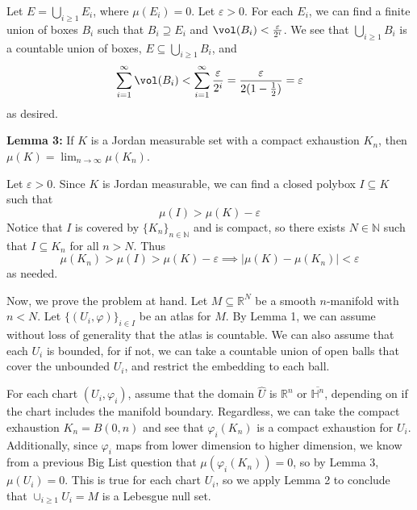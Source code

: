 \documentclass{../../../tex-setup/eh-homework}
\begin{document}
\begin{question}{42}
        Let \(E = \bigcup_{i \geq 1} E_i\), where \(\mu (E_i) = 0\). Let \(\varepsilon > 0\). For each \(E_i\), we can find a finite union of boxes \(B_i\) such that \(B_i \supseteq E_i\) and \(\vol (B_i) < \frac{\varepsilon}{2^i}\). We see that \(\bigcup_{i\geq1}B_i\) is a countable union of boxes, \(E \subseteq \bigcup_{i\geq1}B_i\), and
        \[
            \sum_{i = 1}^{\infty} \vol (B_i) < \sum_{i=1}^{\infty} \frac{\varepsilon}{2^i} = \frac{\varepsilon}{2(1 - \frac{1}{2})} = \varepsilon
        \]
        as desired.

        \medskip

        \textbf{Lemma 3:} If \(K\) is a Jordan measurable set with a compact exhaustion \(K_n\), then \(\mu (K) = \lim_{n \to \infty} \mu (K_n)\).

        Let \(\varepsilon > 0\). Since \(K\) is Jordan measurable, we can find a closed polybox \(I \subseteq K\) such that
        \[
            \mu (I) > \mu (K) - \varepsilon
        \]
        Notice that \(I\) is covered by \(\{ K_n \} _{n \in \mathbb{N}}\) and is compact, so there exists \(N \in \mathbb{N}\) such that \(I \subseteq K_n\) for all \(n > N\). Thus
        \[
            \mu (K_n) > \mu (I) > \mu (K) - \varepsilon \implies |\mu (K) - \mu (K_n)| < \varepsilon
        \]
        as needed.

        \medskip

        Now, we prove the problem at hand. Let \(M \subseteq \mathbb{R}^N\) be a smooth \(n\)-manifold with \(n < N\). Let \(\{ (U_i, \varphi)\}_{i \in I}\) be an atlas for \(M\). By Lemma 1, we can assume without loss of generality that the atlas is countable. We can also assume that each \(U_i\) is bounded, for if not, we can take a countable union of open balls that cover the unbounded \(U_i\), and restrict the embedding to each ball.

        For each chart \((U_i, \varphi_i)\), assume that the domain \(\hat{U}\) is \(\mathbb{R}^n\) or \(\overline{\mathbb{H}^n}\), depending on if the chart includes the manifold boundary. Regardless, we can take the compact exhaustion \(K_n = B(0, n)\) and see that \(\varphi _i (K_n)\) is a compact exhaustion for \(U_i\). Additionally, since \(\varphi _i\) maps from lower dimension to higher dimension, we know from a previous Big List question that \(\mu (\varphi _i (K_n))=0\), so by Lemma 3, \(\mu (U_i) = 0\). This is true for each chart \(U_i\), so we apply Lemma 2 to conclude that \(\cup _{i \geq 1} U_i = M\) is a Lebesgue null set.

        \medskip


\end{question}
\end{document}
